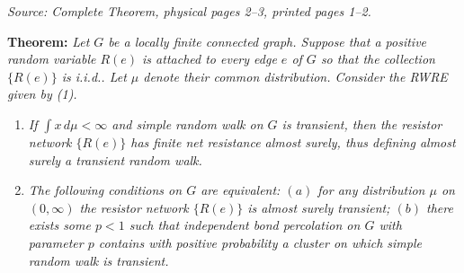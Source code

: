 \documentclass[11pt]{article}
\newcommand{\src}[1]{\par\smallskip\noindent\textit{Source: #1.}\par\nopagebreak[4]\smallskip}
\begin{document}
\src{Complete Theorem, physical pages 2--3, printed pages 1--2}
\noindent\textbf{Theorem:}
\emph{Let $G$ be a locally finite connected graph. Suppose that a positive
random variable $R(e)$ is attached to every edge $e$ of $G$ so that the
collection $\{R(e)\}$ is i.i.d.. Let $\mu$ denote their common distribution.
Consider the RWRE given by (1).}
\begin{enumerate}
\item[$(i)$] \emph{If $\int x\,d\mu<\infty$ and simple random walk on $G$
is transient, then the resistor network $\{R(e)\}$ has finite net resistance
almost surely, thus defining almost surely a transient random walk.}
\item[$(ii)$] \emph{The following conditions on $G$ are equivalent:
$(a)$ for any distribution $\mu$ on $(0,\infty)$ the resistor network
$\{R(e)\}$ is almost surely transient; $(b)$ there exists some $p<1$ such
that independent bond percolation on $G$ with parameter $p$ contains with
positive probability a cluster on which simple random walk is transient.}
\end{enumerate}
\end{document}
